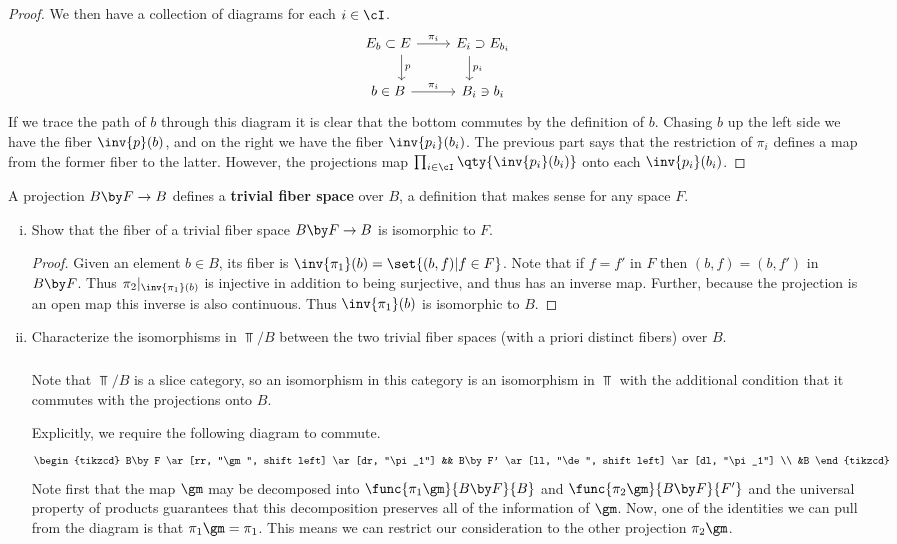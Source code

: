 \documentclass[../../main]{subfiles}
\begin{document}
\begin{exercise}
\begin{enumerate}[(i)]
\begin{proof}
				We then have a collection of diagrams for each \(i\in\cI\).
				\begin{equation*}\begin{tikzcd}
						E_b\subset E \ar[r, "\pi_i"] \ar[d, "p", shift left=4] &
						E_i\supset E_{b_i} \ar[d, "p_i", shift right=4] \\
						b\in B \ar[r, "\pi_i"] & B_i\ni b_i
				\end{tikzcd}\end{equation*}
				If we trace the path of \(b\) through this diagram it is clear
				that the bottom commutes by the definition of \(b\). Chasing
				\(b\) up the left side we have the fiber \(\inv{p}(b)\), and on
				the right we have the fiber \(\inv{p_i}(b_i)\). The previous
				part says that the restriction of \(\pi_i\) defines a map from
				the former fiber to the latter. However, the projections map
				\(\prod_{i\in\cI}\qty{\inv{p_i}(b_i)}\) onto each
				\(\inv{p_i}(b_i)\).
			\end{proof}
	\end{enumerate}
	A projection \(B\by F\to B\) defines a \textbf{trivial fiber space} over
	\(B\), a definition that makes sense for any space \(F\).
	\begin{enumerate}[(i),resume]
		\item Show that the fiber of a trivial fiber space \(B\by F\to B\) is
			isomorphic to \(F\).
			\begin{proof}
				Given an element \(b\in B\), its fiber is
				\(\inv{\pi_1}(b)=\set{(b,f)|f\in F}\). Note that if \(f=f'\) in
				\(F\) then \((b,f)=(b,f')\) in \(B\by F\). Thus
				\(\pi_2|_{\inv{\pi_1}(b)}\) is injective in addition to being
				surjective, and thus has an inverse map. Further, because the
				projection is an open map this inverse is also continuous. Thus
				\(\inv{\pi_1}(b)\) is isomorphic to \(B\).
			\end{proof}

			\pagebreak
		\item Characterize the isomorphisms in \(\Top/B\) between the two
			trivial fiber spaces (with a priori distinct fibers) over \(B\).

			\subparagraph{}
			Note that \(\Top/B\) is a slice category, so an isomorphism in this
			category is an isomorphism in \(\Top\) with the additional condition
			that it commutes with the projections onto \(B\).

			Explicitly, we require the following diagram to commute.
			\[\begin{tikzcd}
					B\by F \ar[rr, "\gm", shift left] \ar[dr, "\pi_1"] &&
					B\by F' \ar[ll, "\de", shift left] \ar[dl, "\pi_1"] \\ &B
			\end{tikzcd}\]
			Note first that the map \(\gm\) may be decomposed into
			\(\func{\pi_1\gm}{B\by F}{B}\) and \(\func{\pi_2\gm}{B\by F}{F'}\)
			and the universal property of products guarantees that this
			decomposition preserves all of the information of \(\gm\). Now, one
			of the identities we can pull from the diagram is that
			\(\pi_1\gm=\pi_1\). This means we can restrict our consideration to
			the other projection \(\pi_2\gm\).


\end{enumerate}
\end{exercise}
\end{document}
